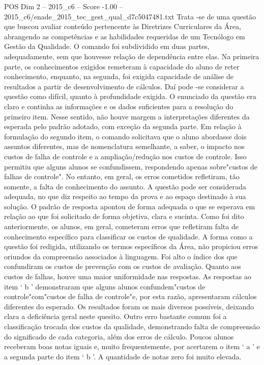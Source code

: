 \begin{textsample}{POS Dim 2 – 2015\_c6 – Score -1.00 – 2015\_c6/enade\_2015\_tec\_gest\_qual\_d7c5047481.txt}
Trata -se de uma questão que buscou avaliar conteúdo pertencente às Diretrizes Curriculares da Área, abrangendo as competências e as habilidades requeridas de um Tecnólogo em Gestão da Qualidade.
O comando foi subdividido em duas partes, adequadamente, sem que houvesse relação de dependência entre elas.
Na primeira parte, os conhecimentos exigidos remeteram à capacidade do aluno de reter conhecimento, enquanto, na segunda, foi exigida capacidade de análise de resultados a partir de desenvolvimento de cálculos.
Daí pode -se considerar a questão como difícil, quanto à profundidade exigida.
O enunciado da questão era claro e continha as informações e os dados suficientes para a resolução do primeiro item.
Nesse sentido, não houve margem a interpretações diferentes da esperada pelo padrão adotado, com exceção da segunda parte.
Em relação à formulação do segundo item, o comando solicitava que o aluno abordasse dois assuntos diferentes, mas de nomenclatura semelhante, a saber, o impacto nos custos de falha de controle e a ampliação/redução nos custos de controle.
Isso permitiu que alguns alunos se confundissem, respondendo apenas sobre"custos de falhas de controle".
No entanto, em geral, os erros cometidos refletiram, tão somente, a falta de conhecimento do assunto.
A questão pode ser considerada adequada, no que diz respeito ao tempo da prova e ao espaço destinado à sua solução.
O padrão de resposta apontou de forma adequada o que se esperava em relação ao que foi solicitado de forma objetiva, clara e sucinta.
Como foi dito anteriormente, os alunos, em geral, cometeram erros que refletiram falta de conhecimento específico para classificar os custos de qualidade.
A forma como a questão foi redigida, utilizando os termos específicos da Área, não propiciou erros oriundos da compreensão associados à linguagem.
Foi alto o índice dos que confundiram os custos de prevenção com os custos de avaliação.
Quanto aos custos de falhas, houve uma maior uniformidade nas respostas.
As respostas ao item ‘ b ’ demonstraram que alguns alunos confundem"custos de controle"com"custos de falha de controle"e, por esta razão, apresentaram cálculos diferentes do esperado.
Os resultados foram os mais diversos possíveis, deixando clara a deficiência geral neste quesito.
Outro erro bastante comum foi a classificação trocada dos custos da qualidade, demonstrando falta de compreensão do significado de cada categoria, além dos erros de cálculo.
Poucos alunos receberam boas notas iguais e, muito frequentemente, por acertarem o item ‘ a ’ e a segunda parte do item ‘ b ’.
A quantidade de notas zero foi muito elevada.

\end{textsample}
